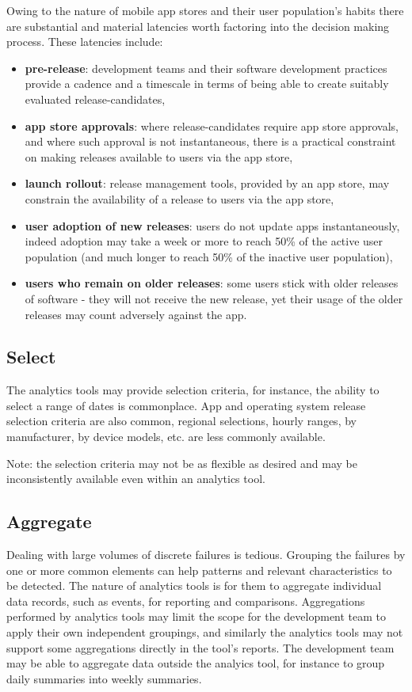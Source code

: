 Owing to the nature of mobile app stores and their user population's habits there are substantial and material latencies worth factoring into the decision making process. These latencies include:
\begin{itemize}
    \item \textbf{pre-release}: development teams and their software development practices provide a cadence and a timescale in terms of being able to create suitably evaluated release-candidates,
    \item \textbf{app store approvals}: where release-candidates require app store approvals, and where such approval is not instantaneous, there is a practical constraint on making releases available to users via the app store,
    \item \textbf{launch rollout}: release management tools, provided by an app store, may constrain the availability of a release to users via the app store,
    \item \textbf{user adoption of new releases}: users do not update apps instantaneously, indeed adoption may take a week or more to reach 50\% of the active user population (and much longer to reach 50\% of the inactive user population), 
    \item \textbf{users who remain on older releases}: some users stick with older releases of software - they will not receive the new release, yet their usage of the older releases may count adversely against the app.
\end{itemize}

\subsection{Select}
The analytics tools may provide selection criteria, for instance, the ability to select a range of dates is commonplace. App and operating system release selection criteria are also common, regional selections, hourly ranges, by manufacturer, by device models, etc. are less commonly available.

Note: the selection criteria may not be as flexible as desired and may be inconsistently available even within an analytics tool.

\subsection{Aggregate}
Dealing with large volumes of discrete failures is tedious. Grouping the failures by one or more common elements can help patterns and relevant characteristics to be detected. The nature of analytics tools is for them to aggregate individual data records, such as events, for reporting and comparisons. Aggregations performed by analytics tools may limit the scope for the development team to apply their own independent groupings, and similarly the analytics tools may not support some aggregations directly in the tool's reports. The development team may be able to aggregate data outside the analyics tool, for instance to group daily summaries into weekly summaries. 

